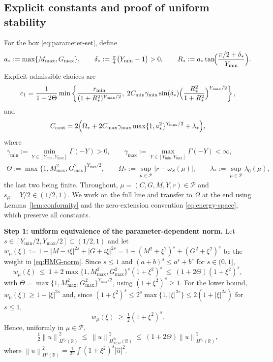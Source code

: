 \documentclass[11pt]{amsart}
\theoremstyle{remark}
\newcommand{\R}{\mathbb{R}}
\newcommand{\Pset}{\mathcal{P}}
\newcommand{\norm}[1]{\left\lVert #1\right\rVert}
\newcommand{\rf}{r}
\begin{document}
\subsection{Explicit constants and proof of uniform stability}
\label{app:proof-uniform}
For the box \eqref{eq:parameter-set}, define
\begin{equation}
  a_\ast:=\max\{M_{\max},G_{\max}\},
  \qquad
  \delta_\ast:=\tfrac{\pi}{4}\bigl(Y_{\min}-1\bigr)>0,
  \qquad
  R_\ast:=a_\ast\tan\!\Bigl(\frac{\pi/2+\delta_\ast}{Y_{\min}}\Bigr).
  \label{eq:uniform-constants-aux}
\end{equation}
Explicit admissible choices are
\begin{equation}
  c_1
  =\frac{1}{1+2\Theta}
  \min\left\{
    \frac{r_{\min}}{(1+R_\ast^2)^{Y_{\max}/2}},\;
    2C_{\min}\gamma_{\min}\sin(\delta_\ast)
    \Bigl(\frac{R_\ast^2}{1+R_\ast^2}\Bigr)^{Y_{\max}/2}
  \right\},
  \label{eq:c1-explicit}
\end{equation}
and
\begin{equation}
  C_{\rm cont}
  =2\Bigl(
    \Omega_\ast
    +2C_{\max}\gamma_{\max}\max\{1,a_\ast^2\}^{Y_{\max}/2}
    +\lambda_\ast
  \Bigr),
  \label{eq:Ccont-explicit}
\end{equation}
where
\begin{equation}
\begin{gathered}
\gamma_{\min}:=\!\!\min_{Y\in[Y_{\min},Y_{\max}]}\!\!\Gamma(-Y)>0,
\qquad
\gamma_{\max}:=\!\!\max_{Y\in[Y_{\min},Y_{\max}]}\!\!\Gamma(-Y)<\infty,
\\
\Theta:=\max\{1,M_{\max}^2,G_{\max}^2\}^{Y_{\max}/2},
\qquad
\Omega_\ast:=\sup_{\mu\in\Pset}|\rf-\omega_S(\mu)|,
\qquad
\lambda_\ast:=\sup_{\mu\in\Pset}\lambda_0(\mu),
\end{gathered}
\label{eq:uniform-aux-constants}
\end{equation}
the last two being finite.
Throughout, $\mu=(C,G,M,Y,\rf)\in\Pset$ and $s_\mu=Y/2\in(1/2,1)$.  We work on
the full line and transfer to $\Omega$ at the end using
Lemma~\ref{lem:conformity} and the zero-extension convention
\eqref{eq:energy-space}, which preserve all constants.

\medskip\noindent
\textbf{Step 1: uniform equivalence of the parameter-dependent norm.}
Let $s\in[Y_{\min}/2,Y_{\max}/2]\subset(1/2,1)$ and let
$w_\mu(\xi):=1+|M-i\xi|^{2s}+|G+i\xi|^{2s}
=1+(M^2+\xi^2)^{s}+(G^2+\xi^2)^{s}$ be the weight in
\eqref{eq:HMG-norm}.  Since $s\le1$ and $(a+b)^s\le a^s+b^s$ for $s\in(0,1]$,
\[
  w_\mu(\xi)\ \le\ 1+2\max\{1,M_{\max}^2,G_{\max}^2\}^{s}(1+\xi^2)^{s}
  \ \le\ (1+2\Theta)(1+\xi^2)^{s},
\]
with $\Theta=\max\{1,M_{\max}^2,G_{\max}^2\}^{Y_{\max}/2}$, using
$(1+\xi^2)^s\ge1$.  For the lower bound, $w_\mu(\xi)\ge1+|\xi|^{2s}$ and,
since $(1+\xi^2)^s\le2^s\max\{1,|\xi|^{2s}\}\le2(1+|\xi|^{2s})$ for
$s\le1$,
\[
  w_\mu(\xi)\ \ge\ \tfrac12(1+\xi^2)^{s}.
\]
Hence, uniformly in $\mu\in\Pset$,
\begin{equation}
  \tfrac12\norm{u}_{H^{s_\mu}(\R)}^2
  \ \le\ \norm{u}_{H^{s_\mu}_{M,G}(\R)}^2
  \ \le\ (1+2\Theta)\norm{u}_{H^{s_\mu}(\R)}^2 ,
  \label{eq:uniform-norm-equivalence}
\end{equation}
where $\norm{u}_{H^{s}(\R)}^2=\tfrac1{2\pi}\int(1+\xi^2)^{s}|\widehat u|^2$.
\end{document}
